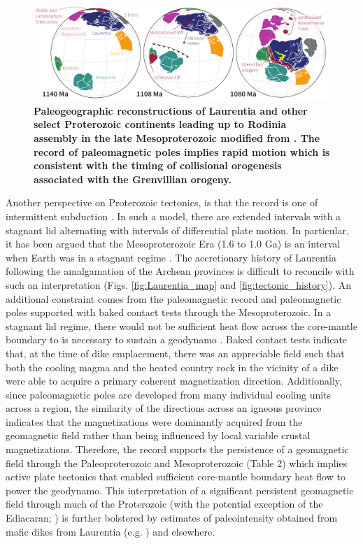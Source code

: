 \documentclass[11pt,letterpaper]{article}
\begin{document}
\begin{figure}
\centering
\includegraphics[width=\textwidth]{../Figures/Grenville_Reconstruction.pdf}
\caption{\small{\textbf{Paleogeographic reconstructions of Laurentia and other select Proterozoic continents leading up to Rodinia assembly in the late Mesoproterozoic modified from \cite{Swanson-Hysell2019a}. The record of paleomagnetic poles implies rapid motion which is consistent with the timing of collisional orogenesis associated with the Grenvillian orogeny.}}}
\label{fig:Grenville_reconstructions}
\end{figure}

Another perspective on Proterozoic tectonics, is that the record is one of intermittent subduction \citep{Silver2008a, ONeill2013a}. In such a model, there are extended intervals with a stagnant lid alternating with intervals of differential plate motion. In particular, it has been argued that the Mesoproterozoic Era (1.6 to 1.0 Ga) is an interval when Earth was in a stagnant regime \citep{Silver2008a, ONeill2013a}. The accretionary history of Laurentia following the amalgamation of the Archean provinces is difficult to reconcile with such an interpretation (Figs. \ref{fig:Laurentia_map} and \ref{fig:tectonic_history}). An additional constraint comes from the paleomagnetic record and paleomagnetic poles supported with baked contact tests through the Mesoproterozoic. In a stagnant lid regime, there would not be sufficient heat flow across the core-mantle boundary to is necessary to sustain a geodynamo \citep{Nimmo2000a, Buffett2000b}. Baked contact tests indicate that, at the time of dike emplacement, there was an appreciable field such that both the cooling magma and the heated country rock in the vicinity of a dike were able to acquire a primary coherent magnetization direction. Additionally, since paleomagnetic poles are developed from many individual cooling units across a region, the similarity of the directions across an igneous province indicates that the magnetizations were dominantly acquired from the geomagnetic field rather than being influenced by local variable crustal magnetizations.  Therefore, the record supports the persistence of a geomagnetic field through the Paleoproterozoic and Mesoproterozoic (Table 2) which implies active plate tectonics that enabled sufficient core-mantle boundary heat flow to power the geodynamo.  This interpretation of a significant persistent geomagnetic field through much of the Proterozoic (with the potential exception of the Ediacaran; \citealp{Bono2019a}) is further bolstered by estimates of paleointensity obtained from mafic dikes from Laurentia (e.g. \citealp{Macouin2006a}) and elsewhere. 
\end{document}

